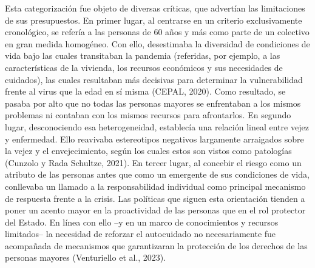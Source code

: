 Esta categorización fue objeto de diversas críticas, que advertían las limitaciones de sus presupuestos. En primer lugar, al centrarse en un criterio exclusivamente cronológico, se refería a las personas de 60 años y más como parte de un colectivo en gran medida homogéneo. Con ello, desestimaba la diversidad de condiciones de vida bajo las cuales transitaban la pandemia (referidas, por ejemplo, a las características de la vivienda, los recursos económicos y sus necesidades de cuidados), las cuales resultaban más decisivas para determinar la vulnerabilidad frente al virus que la edad en sí misma (CEPAL, 2020). Como resultado, se pasaba por alto que no todas las personas mayores se enfrentaban a los mismos problemas ni contaban con los mismos recursos para afrontarlos. En segundo lugar, desconociendo esa heterogeneidad, establecía una relación lineal entre vejez y enfermedad. Ello reavivaba estereotipos negativos largamente arraigados sobre la vejez y el envejecimiento, según los cuales estos son vistos como patologías (Cunzolo y Rada Schultze, 2021). En tercer lugar, al concebir el riesgo como un atributo de las personas antes que como un emergente de sus condiciones de vida, conllevaba un llamado a la responsabilidad individual como principal mecanismo de respuesta frente a la crisis. Las políticas que siguen esta orientación tienden a poner un acento mayor en la proactividad de las personas que en el rol protector del Estado. En línea con ello --y en un marco de conocimientos y recursos limitados-- la necesidad de reforzar el autocuidado no necesariamente fue acompañada de mecanismos que garantizaran la protección de los derechos de las personas mayores (Venturiello et al., 2023).

